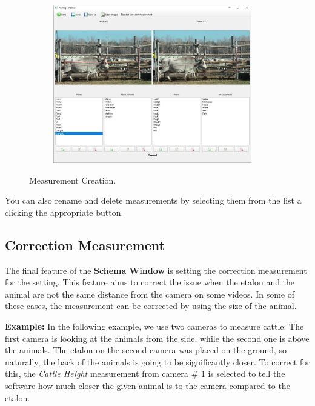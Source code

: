 \documentclass[10pt,a4paper,oneside]{report}             %
\begin{document}
\begin{figure}[H]
	\centering
	\begin{subfigure}{\textwidth}
		\centering 
		\includegraphics[width=0.95\textwidth]{./images/SchemDist.jpg}
	\end{subfigure}
	\caption[]
	{\small  Measurement Creation.}
\end{figure} 

You can also rename and delete measurements by selecting them from the list a clicking the appropriate button.

\subsection{Correction Measurement}

The final feature of  the \textbf{Schema Window} is setting the correction measurement for the  setting. This feature aims to correct the issue when the etalon and the animal are not the same distance from the camera on some videos. In some of these cases, the measurement can be corrected by using the size of the animal.

\textbf{Example:} In the following example, we use two cameras to measure cattle: The first camera is looking at the animals from the side, while the second one is above the animals. The etalon on the second camera was placed on the ground, so naturally, the back of the animals is going to be significantly closer. To correct for this, the \textit{Cattle Height} measurement from camera \# 1 is selected to tell the software how much closer the given animal is to the camera compared to the etalon.
\end{document}
